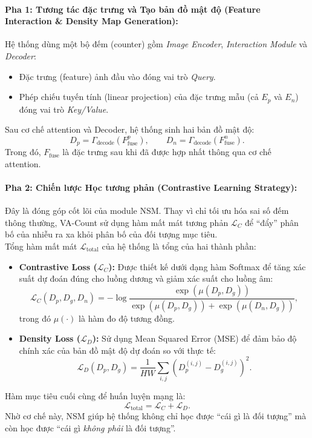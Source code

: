 \documentclass[a4paper,12pt]{report}
\numberwithin{figure}{chapter}
\numberwithin{table}{chapter}
\begin{document}
\paragraph{Pha 1: Tương tác đặc trưng và Tạo bản đồ mật độ (Feature Interaction \& Density Map Generation):} 
Hệ thống dùng một bộ đếm (counter) gồm \textit{Image Encoder}, \textit{Interaction Module} và \textit{Decoder}:
\begin{itemize}
    \item Đặc trưng (feature) ảnh đầu vào đóng vai trò \textit{Query}.
    \item Phép chiếu tuyến tính (linear projection) của đặc trưng mẫu (cả $E_p$ và $E_n$) đóng vai trò \textit{Key/Value}.
\end{itemize}
Sau cơ chế attention và Decoder, hệ thống sinh hai bản đồ mật độ:
\begin{equation}
D_p = \Gamma_{\text{decode}}(F^p_{\text{fuse}}), \qquad
D_n = \Gamma_{\text{decode}}(F^n_{\text{fuse}}).
\end{equation}
Trong đó, $F_{\text{fuse}}$ là đặc trưng sau khi đã được hợp nhất thông qua cơ chế attention.

\paragraph{Pha 2: Chiến lược Học tương phản (Contrastive Learning Strategy):}
Đây là đóng góp cốt lõi của module NSM. Thay vì chỉ tối ưu hóa sai số đếm thông thường, 
VA-Count sử dụng hàm mất mát tương phản $\mathcal{L}_C$ để “đẩy” phân bố của nhiễu ra xa khỏi 
phân bố của đối tượng mục tiêu. 
\\[1em]
Tổng hàm mất mát $\mathcal{L}_{\text{total}}$ của hệ thống là tổng của hai thành phần:
\begin{itemize}
    \item \textbf{Contrastive Loss ($\mathcal{L}_C$):} Được thiết kế dưới dạng hàm Softmax để tăng xác suất dự đoán
    đúng cho luồng dương và giảm xác suất cho luồng âm:
    \begin{equation}
    \mathcal{L}_C(D_p, D_g, D_n) =
    - \log \frac{\exp\left(\mu(D_p, D_g)\right)}
    {\exp\left(\mu(D_p, D_g)\right) + \exp\left(\mu(D_n, D_g)\right)},
    \end{equation}
    trong đó $\mu(\cdot)$ là hàm đo độ tương đồng.
    \item \textbf{Density Loss ($\mathcal{L}_D$):} Sử dụng Mean Squared Error (MSE) để đảm bảo độ chính xác của
    bản đồ mật độ dự đoán so với thực tế:
    \begin{equation}
    \mathcal{L}_D(D_p, D_g) = \frac{1}{HW} \sum_{i,j} \left(D^{(i,j)}_p - D^{(i,j)}_g\right)^2.
    \end{equation}
\end{itemize}
Hàm mục tiêu cuối cùng để huấn luyện mạng là:
\begin{equation}
\mathcal{L}_{\text{total}} = \mathcal{L}_C + \mathcal{L}_D.
\end{equation}
Nhờ cơ chế này, NSM giúp hệ thống không chỉ học được ``cái gì là đối tượng'' mà còn học được ``cái gì \emph{không phải} là đối tượng''.
\end{document}
